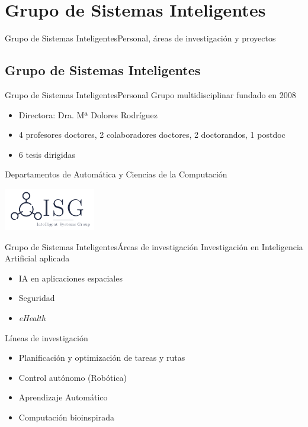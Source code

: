 \documentclass[10pt,compress]{beamer} %
\begin{document}
\section{Grupo de Sistemas Inteligentes}
{
    \sectionheaderWhite %
    \begin{frame}{Grupo de Sistemas Inteligentes}{Personal, áreas de investigación y proyectos}
    \end{frame}
}

\subsection{Grupo de Sistemas Inteligentes}
\begin{frame}{Grupo de Sistemas Inteligentes}{Personal}
    Grupo multidisciplinar fundado en 2008
        \begin{itemize}
        \item Directora: Dra. Mª Dolores Rodríguez
        \item 4 profesores doctores, 2 colaboradores doctores, 2 doctorandos, 1 postdoc
        \item 6 tesis dirigidas
        \end{itemize}

    Departamentos de Automática y Ciencias de la Computación

     \centering
     \bigskip 
     \includegraphics[width=4cm]{figs/isg-color}
    \note{    
    }
\end{frame}

\begin{frame}{Grupo de Sistemas Inteligentes}{Áreas de investigación}
    Investigación en Inteligencia Artificial aplicada
        \begin{itemize}
        \item IA en aplicaciones espaciales
        \item Seguridad
        \item \textit{eHealth}
        \end{itemize}

    Líneas de investigación
        \begin{itemize}
        \item Planificación y optimización de tareas y rutas
        \item Control autónomo (Robótica)
        \item Aprendizaje Automático
        \item Computación bioinspirada
        \end{itemize}

    \note{    
    }
\end{frame}
\end{document}
